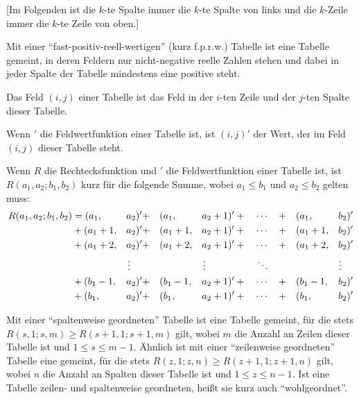 [Im Folgenden ist die $k$-te Spalte immer die $k$-te Spalte von links und die $k$-Zeile immer die $k$-te Zeile von oben.]
\begin{definition}
    Mit einer "`fast-positiv-reell-wertigen"' (kurz f.p.r.w.) Tabelle ist eine Tabelle gemeint, in deren Feldern nur 
    nicht-negative reelle Zahlen stehen und dabei in jeder Spalte der Tabelle mindestens eine positive steht.
\end{definition}
\begin{definition}
    Das Feld $(i, j)$ einer Tabelle ist das Feld in der $i$-ten Zeile und der $j$-ten Spalte dieser Tabelle.
\end{definition}
\begin{definition}
    Wenn $'$ die Feldwertfunktion einer Tabelle ist, ist $(i, j)'$ der Wert, der im Feld $(i, j)$ dieser Tabelle 
    steht.
\end{definition}
\begin{definition}\label{rfunktion}
    Wenn $R$ die Rechtecksfunktion und $'$ die Feldwertfunktion einer Tabelle ist, ist $R(a_1, a_2; b_1, b_2)$ kurz 
    für die folgende Summe, wobei $a_1\leq b_1$ und $a_2\leq b_2$ gelten muss:
    \begin{alignat*}{6}
        R(a_1, a_2; b_1, b_2) &= (a_1, &&a_2)' + &&(a_1, &&a_2+1)' + \quad \cdots \quad + &&(a_1, &&b_2)'\\
        &+(a_1+1, &&a_2)' + &&(a_1+1, &&a_2+1)' +\quad \cdots \quad + &&(a_1+1, &&b_2)'\\
        &+(a_1+2, &&a_2)' + &&(a_1+2, &&a_2+1)' +\quad \cdots \quad + &&(a_1+2, &&b_2)'\\
        & &&\vdotswithin{a} && &&\vdotswithin{a}\quad\quad\quad\quad\quad \ddots && &&\vdotswithin{b} \\
        &+(b_1-1, &&a_2)' + &&(b_1-1, &&a_2+1)' +\quad \cdots \quad + &&(b_1-1, &&b_2)'\\
        &+(b_1, &&a_2)' + &&(b_1, &&a_2+1)' + \quad \cdots \quad + &&(b_1, &&b_2)'
    \end{alignat*}    
\end{definition}
\begin{definition}
    Mit einer "`spaltenweise geordneten"' Tabelle ist eine Tabelle gemeint, für die stets $R(s, 1; s, m)\geq 
    R(s+1, 1; s+1, m)$ gilt, wobei $m$ die Anzahl an Zeilen dieser Tabelle ist und $1\leq s\leq m-1$. Ähnlich ist 
    mit einer "`zeilenweise geordneten"' Tabelle eine gemeint, für die stets $R(z, 1; z, n)\geq R(z+1, 1; z+1, n)$ 
    gilt, wobei $n$ die Anzahl an Spalten dieser Tabelle ist und $1\leq z\leq n-1$. Ist eine Tabelle zeilen- und 
    spaltenweise geordneten, heißt sie kurz auch "`wohlgeordnet"'.
\end{definition}

